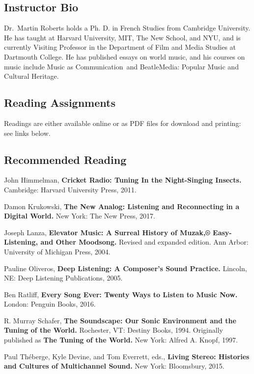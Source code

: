\documentclass[
  letterpaper,
  DIV=11,
  numbers=noendperiod]{scrartcl}
\begin{document}
\subsection{Instructor Bio}\label{instructor-bio}

Dr.~Martin Roberts holds a Ph. D. in French Studies from Cambridge
University. He has taught at Harvard University, MIT, The New School,
and NYU, and is currently Visiting Professor in the Department of Film
and Media Studies at Dartmouth College. He has published essays on world
music, and his courses on music include Music as Communication~and
BeatleMedia: Popular Music and Cultural Heritage.

\subsection{Reading Assignments}\label{reading-assignments}

Readings are either available online or as PDF files for download and
printing: see links below.

\subsection{Recommended Reading}\label{recommended-reading}

John Himmelman, \textbf{Cricket Radio: Tuning In the Night-Singing
Insects.} Cambridge: Harvard University Press, 2011.

Damon Krukowski, \textbf{The New Analog: Listening and Reconnecting in a
Digital World.} New York: The New Press, 2017.

Joseph Lanza, \textbf{Elevator Music: A Surreal History of Muzak,®
Easy-Listening, and Other Moodsong.} Revised and expanded edition. Ann
Arbor: University of Michigan Press, 2004.

Pauline Oliveros, \textbf{Deep Listening: A Composer's Sound Practice.}
Lincoln, NE: Deep Listening Publications, 2005.

Ben Ratliff, \textbf{Every Song Ever: Twenty Ways to Listen to Music
Now.} London: Penguin Books, 2016.

R. Murray Schafer, \textbf{The Soundscape: Our Sonic Environment and the
Tuning of the World.} Rochester, VT: Destiny Books, 1994. Originally
published as \textbf{The Tuning of the World.} New York: Alfred A.
Knopf, 1997.

Paul Théberge, Kyle Devine, and Tom Everrett, eds., \textbf{Living
Stereo: Histories and Cultures of Multichannel Sound.} New York:
Bloomsbury, 2015.
\end{document}
